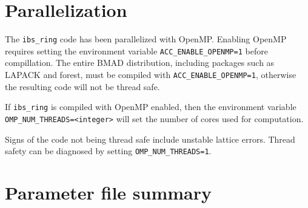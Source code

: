 \documentclass[11pt]{article}
\begin{document}
\section{Parallelization}
The {\tt ibs_ring} code has been parallelized with OpenMP.  Enabling OpenMP
requires setting the environment variable {\tt ACC_ENABLE_OPENMP=1} before
compillation.  The entire
BMAD distribution, including packages such as LAPACK and forest, must be
compiled with {\tt ACC_ENABLE_OPENMP=1}, otherwise the resulting code
will not be thread safe.

If {\tt ibs_ring} is compiled with OpenMP enabled, then the environment
variable {\tt OMP_NUM_THREADS=<integer>} will set the number of cores used for 
computation.

Signs of the code not being thread safe include unstable lattice errors.
Thread safety can be diagnosed by setting {\tt OMP_NUM_THREADS=1}.

\section{Parameter file summary}
\label{s:run}
\end{document}
